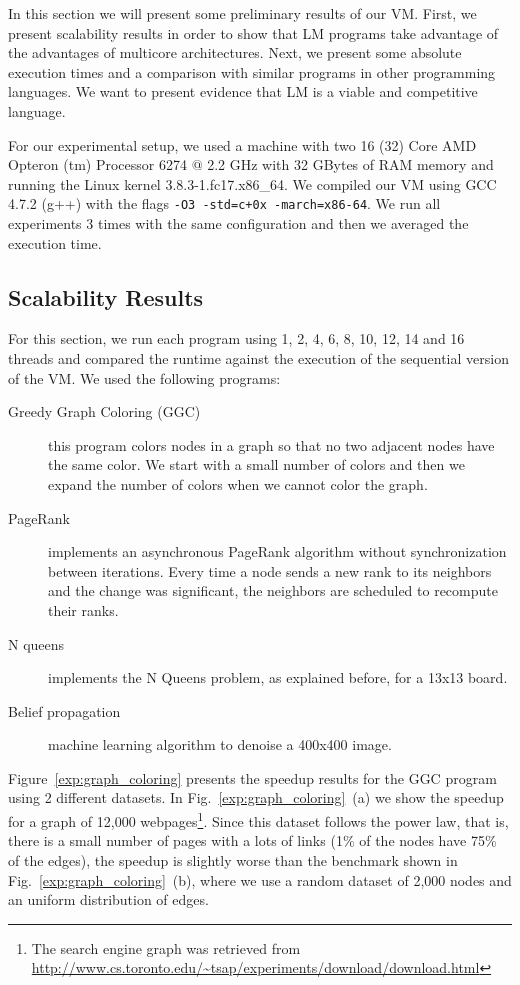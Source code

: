 In this section we will present some preliminary results of our VM.
First, we present scalability results in order to show that LM programs take advantage of the advantages of multicore architectures.
Next, we present some absolute execution times and a comparison with similar programs in other programming languages.
We want to present evidence that LM is a viable and competitive language.

For our experimental setup, we used a machine 
with two 16 (32) Core AMD Opteron
(tm) Processor 6274 $@$ 2.2 GHz with 32 GBytes of RAM memory and running the Linux
kernel 3.8.3-1.fc17.x86\_64.
     We compiled our VM using GCC 4.7.2 (g++) with the flags \texttt{-O3 -std=c+0x -march=x86-64}.
     We run all experiments 3 times with the same configuration and then we averaged the execution time.
     
\subsection{Scalability Results}

For this section, we run each program using 1, 2, 4, 6, 8, 10, 12, 14 and 16 threads and compared the runtime against the execution of the sequential version of the VM. We used the following programs:

\newcommand{\figsize}[0]{6.5cm}
\captionsetup[sub]{              %
       font=scriptsize}

\begin{description}
   \item[Greedy Graph Coloring (GGC)] this program colors nodes in a graph so that no two adjacent nodes have the same color. We start with a small number of colors and then we expand the number of colors when we cannot color the graph.
   \item[PageRank] implements an asynchronous PageRank algorithm without synchronization between iterations. Every time a node sends a new rank to its neighbors and the change was significant, the neighbors are scheduled to recompute their ranks.
   \item[N queens] implements the N Queens problem, as explained before, for a 13x13 board.
   \item[Belief propagation] machine learning algorithm to denoise a 400x400 image.
\end{description}

Figure~\ref{exp:graph_coloring} presents the speedup results for the GGC program using 2 different datasets. In Fig.~\ref{exp:graph_coloring}~(a) we show the speedup for a graph of 12,000 webpages\footnote{The search engine graph was retrieved from \url{http://www.cs.toronto.edu/~tsap/experiments/download/download.html}}. Since this dataset follows the power law, that is, there is a small number of pages with a lots of links (1\% of the nodes have 75\% of the edges), the speedup is slightly worse than the benchmark shown in Fig.~\ref{exp:graph_coloring}~(b), where we use a random dataset of 2,000 nodes and an uniform distribution of edges.

